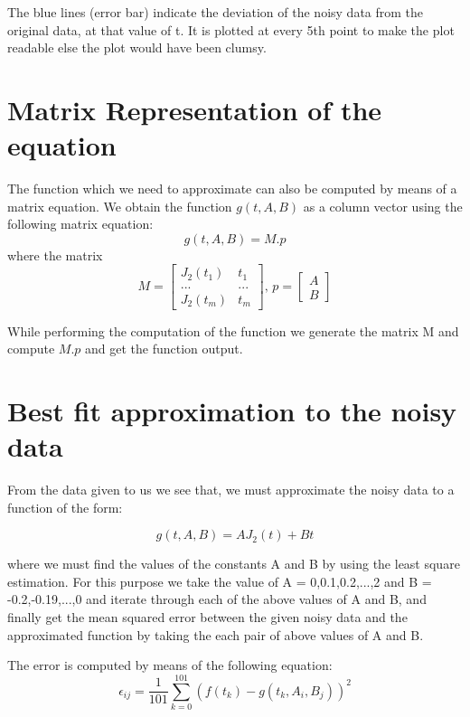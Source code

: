 \documentclass[11pt, a4paper]{article}
\begin{document}
The blue lines (error bar) indicate the deviation of the noisy data from the original data, at that value of t. It is plotted at every 5th point to make the plot readable else the plot would have been clumsy.

\section{Matrix Representation of the equation}
The function which we need to approximate can also be computed by means of a matrix equation. We obtain the function $g(t,A,B)$ as a column vector using the following matrix equation:
\begin{equation}\label{eq:3}
    g(t,A,B) = M.p
\end{equation}
where the matrix
\begin{equation}
M=\left[\begin{matrix}
J_2(t_1)&t_1\\
...&...\\
J_2(t_m)&t_m
\end{matrix}\right]\text{, }
p=\left[\begin{matrix}
A\\B
\end{matrix}\right]
\end{equation}

While performing the computation of the function we generate the matrix M and compute $M.p$ and get the function output.

\section{Best fit approximation to the noisy data}

From the data given to us we see that, we must approximate the noisy data to a function of the form:

\begin{equation}\label{eq:4}
    g(t, A, B) = AJ_2(t)+Bt
\end{equation}

where we must find the values of the constants A and B by using the least square estimation. For this purpose we take the value of A = 0,0.1,0.2,...,2 and B = -0.2,-0.19,...,0 and iterate through each of the above values of A and B, and finally get the mean squared error between the given noisy data and the approximated function by taking the each pair of above values of A and B. 
\newline

The error is computed by means of the following equation:
\begin{equation}\label{eq:5}
    \epsilon_{ij} = \frac{1}{101}\sum_{k=0}^{101}(f(t_k) - g(t_k, A_i, B_j))^2
\end{equation}
\end{document}
